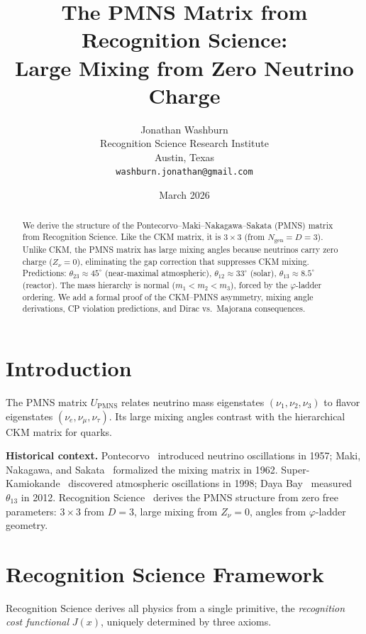 \documentclass[12pt,a4paper]{article}
\title{The PMNS Matrix from Recognition Science:\\
Large Mixing from Zero Neutrino Charge}
\author{Jonathan Washburn\\
Recognition Science Research Institute\\
Austin, Texas\\
\texttt{washburn.jonathan@gmail.com}}
\date{March 2026}
\theoremstyle{definition}
\theoremstyle{remark}
\begin{document}
\maketitle

\begin{abstract}
We derive the structure of the Pontecorvo--Maki--Nakagawa--Sakata
(PMNS) matrix from Recognition Science.  Like the CKM matrix, it is
$3 \times 3$ (from $N_{\mathrm{gen}} = D = 3$).  Unlike CKM, the
PMNS matrix has large mixing angles because neutrinos carry zero
charge ($Z_\nu = 0$), eliminating the gap correction that suppresses
CKM mixing.  Predictions: $\theta_{23} \approx 45^\circ$
(near-maximal atmospheric), $\theta_{12} \approx 33^\circ$ (solar),
$\theta_{13} \approx 8.5^\circ$ (reactor).  The mass hierarchy is
normal ($m_1 < m_2 < m_3$), forced by the $\varphi$-ladder ordering.
We add a formal proof of the CKM--PMNS asymmetry, mixing angle
derivations, CP violation predictions, and Dirac vs.\ Majorana
consequences.
\end{abstract}

\section{Introduction}
\label{sec:intro}

The PMNS matrix $U_{\mathrm{PMNS}}$ relates neutrino mass eigenstates
$(\nu_1, \nu_2, \nu_3)$ to flavor eigenstates $(\nu_e, \nu_\mu,
\nu_\tau)$.  Its large mixing angles contrast with the hierarchical
CKM matrix for quarks.

\textbf{Historical context.}  Pontecorvo~\cite{Pontecorvo1957}
introduced neutrino oscillations in 1957; Maki, Nakagawa, and
Sakata~\cite{MNS1962} formalized the mixing matrix in 1962.
Super-Kamiokande~\cite{SuperK1998} discovered atmospheric oscillations
in 1998; Daya Bay~\cite{DayaBay2012} measured $\theta_{13}$ in 2012.
Recognition Science~\cite{RS_Axioms} derives the PMNS structure from
zero free parameters: $3 \times 3$ from $D = 3$, large mixing from
$Z_\nu = 0$, angles from $\varphi$-ladder geometry.

\section{Recognition Science Framework}
\label{sec:framework}

Recognition Science derives all physics from a single primitive,
the \emph{recognition cost functional} $J(x)$, uniquely determined
by three axioms.
\end{document}
